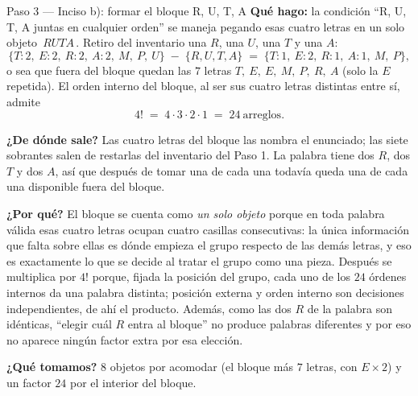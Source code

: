 \documentclass[11pt]{article}
\begin{document}
\begin{paso}{Paso 3 --- Inciso b): formar el bloque R, U, T, A}
\textbf{Qué hago:} la condición ``R, U, T, A juntas en cualquier orden'' se maneja pegando esas cuatro
letras en un solo objeto $\boxed{\,RUTA\,}$. Retiro del inventario una $R$, una $U$, una $T$ y una $A$:
\[
\{T{:}2,\ E{:}2,\ R{:}2,\ A{:}2,\ M,\ P,\ U\}\;-\;\{R,U,T,A\}
\;=\;\{T{:}1,\ E{:}2,\ R{:}1,\ A{:}1,\ M,\ P\},
\]
o sea que fuera del bloque quedan las $7$ letras $T,\ E,\ E,\ M,\ P,\ R,\ A$ (solo la $E$ repetida). El
orden interno del bloque, al ser sus cuatro letras distintas entre sí, admite
\[
4! \;=\; 4\cdot3\cdot2\cdot1 \;=\; 24 \ \text{arreglos}.
\]

\textbf{¿De dónde sale?} Las cuatro letras del bloque las nombra el enunciado; las siete sobrantes salen de
restarlas del inventario del Paso 1. La palabra tiene dos $R$, dos $T$ y dos $A$, así que después de tomar
una de cada una todavía queda una de cada una disponible fuera del bloque.

\textbf{¿Por qué?} El bloque se cuenta como \emph{un solo objeto} porque en toda palabra válida esas cuatro
letras ocupan cuatro casillas consecutivas: la única información que falta sobre ellas es dónde empieza el
grupo respecto de las demás letras, y eso es exactamente lo que se decide al tratar el grupo como una pieza.
Después se multiplica por $4!$ porque, fijada la posición del grupo, cada uno de los $24$ órdenes internos da
una palabra distinta; posición externa y orden interno son decisiones independientes, de ahí el producto.
Además, como las dos $R$ de la palabra son idénticas, ``elegir cuál $R$ entra al bloque'' no produce
palabras diferentes y por eso no aparece ningún factor extra por esa elección.

\textbf{¿Qué tomamos?} $8$ objetos por acomodar (el bloque más $7$ letras, con $E\times2$) y un factor $24$
por el interior del bloque.
\end{paso}
\end{document}
